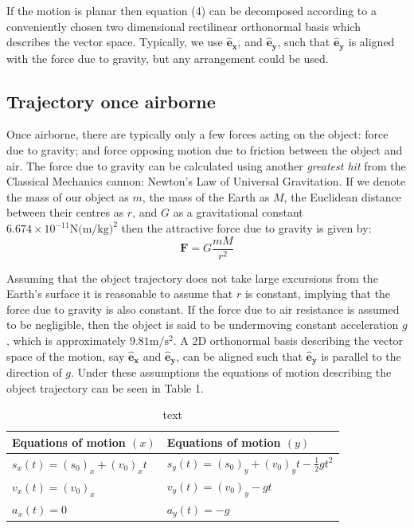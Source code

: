 \documentclass[a4paper]{article}
\begin{document}
If the motion is planar then equation (4) can be decomposed according to a conveniently chosen two dimensional rectilinear orthonormal basis which describes the vector space. Typically, we use $\boldsymbol{\hat{e}_x}$, and $\boldsymbol{\hat{e}_y}$, such that $\boldsymbol{\hat{e}_y}$ is aligned with the force due to gravity, but any arrangement could be used.

\subsection{Trajectory once airborne}
Once airborne, there are typically only a few forces acting on the object: force due to gravity; and force opposing motion due to friction between the object and air. The force due to gravity can be calculated using another \textit{greatest hit} from the Classical Mechanics cannon: Newton's Law of Universal Gravitation. If we denote the mass of our object as $m$, the mass of the Earth as $M$, the Euclidean distance between their centres as $r$, and $G$ as a gravitational constant $6.674×10^{−11} \si{\newton(\meter\per\kilogram)^2}$ then the attractive force due to gravity is given by:
\begin{equation}
\boldsymbol{F} = G \frac{m M}{r^2}
\end{equation}

Assuming that the object trajectory does not take large excursions from the Earth's surface it is reasonable to assume that $r$ is constant, implying that the force due to gravity is also constant. If the force due to air resistance is assumed to be negligible, then the object is said to be undermoving constant acceleration $g$, which is approximately $9.81\si{\meter\per\second^2}$. A 2D orthonormal basis describing the vector space of the motion, say $\boldsymbol{\hat{e}_x}$ and $\boldsymbol{\hat{e}_y}$, can be aligned such that $\boldsymbol{\hat{e}_y}$ is parallel to the direction of $g$. Under these assumptions the equations of motion describing the object trajectory can be seen in Table 1.
\begin{table}[h]
	\centering
	\caption{text}
	\begin{tabular}{ll}
		\toprule
		Equations of motion $(x)$ & Equations of motion $(y)$\\
		\midrule
		$s_x(t) = (s_0)_x + (v_0)_x t$ & $s_y(t) = (s_0)_y + (v_0)_y t -\frac{1}{2}gt^2 $ \\
		$v_x(t) = (v_0)_x$ & $v_y(t) = (v_0)_y - gt$ \\
		$a_x(t) = 0$ & $a_y(t) = -g$ \\
		\bottomrule
	\end{tabular}
\end{table}
\end{document}
